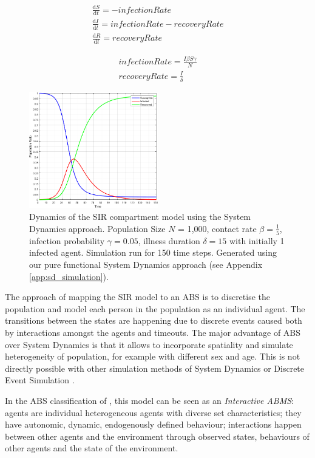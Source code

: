 \begin{equation}
\begin{aligned}
\frac{\mathrm d S}{\mathrm d t} = -infectionRate \\
\frac{\mathrm d I}{\mathrm d t} = infectionRate - recoveryRate \\
\frac{\mathrm d R}{\mathrm d t} = recoveryRate 
\end{aligned}
\end{equation}

\begin{equation}
\begin{aligned}
infectionRate = \frac{I \beta S \gamma}{N} \\
recoveryRate = \frac{I}{\delta} 
\end{aligned}
\end{equation}

\begin{figure}
	\centering
	\includegraphics[width=0.5\textwidth, angle=0]{./fig/timedriven/SIR_SD_1000agents_150t_001dt.png}
	\caption[Dynamics of the SIR compartment model using the System Dynamics approach]{Dynamics of the SIR compartment model using the System Dynamics approach. Population Size $N$ = 1,000, contact rate $\beta =  \frac{1}{5}$, infection probability $\gamma = 0.05$, illness duration $\delta = 15$ with initially 1 infected agent. Simulation run for 150 time steps. Generated using our pure functional System Dynamics approach (see Appendix \ref{app:sd_simulation}).}
	\label{fig:sir_sd_dynamics}
\end{figure}

The approach of mapping the SIR model to an ABS is to discretise the population and model each person in the population as an individual agent. The transitions between the states are happening due to discrete events caused both by interactions amongst the agents and timeouts. The major advantage of ABS over System Dynamics is that it allows to incorporate spatiality and simulate heterogeneity of population, for example with different sex and age. This is not directly possible with other simulation methods of System Dynamics or Discrete Event Simulation \cite{zeigler_theory_2000}.

In the ABS classification of \cite{macal_everything_2016}, this model can be seen as an \textit{Interactive ABMS}: agents are individual heterogeneous agents with diverse set characteristics; they have autonomic, dynamic, endogenously defined behaviour; interactions happen between other agents and the environment through observed states, behaviours of other agents and the state of the environment.